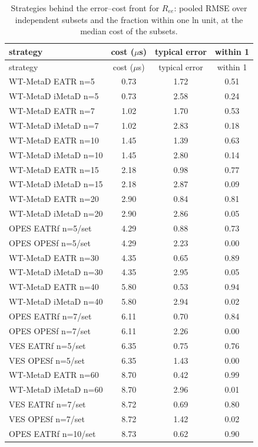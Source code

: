 \begin{longtable}{lccc}
\caption{Strategies behind the error--cost front for $R_{ee}$: pooled RMSE over independent subsets and the fraction within one ln unit, at the median cost of the subsets.}\label{tab:s10Ree}\\
\toprule
strategy & cost ($\mu$s) & typical error & within 1\\ \midrule
\endfirsthead
\toprule
strategy & cost ($\mu$s) & typical error & within 1\\ \midrule
\endhead
\bottomrule
\endfoot
WT-MetaD EATR n=5 & 0.73 & 1.72 & 0.51 \\
WT-MetaD iMetaD n=5 & 0.73 & 2.58 & 0.24 \\
WT-MetaD EATR n=7 & 1.02 & 1.70 & 0.53 \\
WT-MetaD iMetaD n=7 & 1.02 & 2.83 & 0.18 \\
WT-MetaD EATR n=10 & 1.45 & 1.39 & 0.63 \\
WT-MetaD iMetaD n=10 & 1.45 & 2.80 & 0.14 \\
WT-MetaD EATR n=15 & 2.18 & 0.98 & 0.77 \\
WT-MetaD iMetaD n=15 & 2.18 & 2.87 & 0.09 \\
WT-MetaD EATR n=20 & 2.90 & 0.84 & 0.81 \\
WT-MetaD iMetaD n=20 & 2.90 & 2.86 & 0.05 \\
OPES EATRf n=5/set & 4.29 & 0.88 & 0.73 \\
OPES OPESf n=5/set & 4.29 & 2.23 & 0.00 \\
WT-MetaD EATR n=30 & 4.35 & 0.65 & 0.89 \\
WT-MetaD iMetaD n=30 & 4.35 & 2.95 & 0.05 \\
WT-MetaD EATR n=40 & 5.80 & 0.53 & 0.94 \\
WT-MetaD iMetaD n=40 & 5.80 & 2.94 & 0.02 \\
OPES EATRf n=7/set & 6.11 & 0.70 & 0.84 \\
OPES OPESf n=7/set & 6.11 & 2.26 & 0.00 \\
VES EATRf n=5/set & 6.35 & 0.75 & 0.76 \\
VES OPESf n=5/set & 6.35 & 1.43 & 0.00 \\
WT-MetaD EATR n=60 & 8.70 & 0.42 & 0.99 \\
WT-MetaD iMetaD n=60 & 8.70 & 2.96 & 0.01 \\
VES EATRf n=7/set & 8.72 & 0.69 & 0.80 \\
VES OPESf n=7/set & 8.72 & 1.42 & 0.02 \\
OPES EATRf n=10/set & 8.73 & 0.62 & 0.90 \\

\end{longtable}
